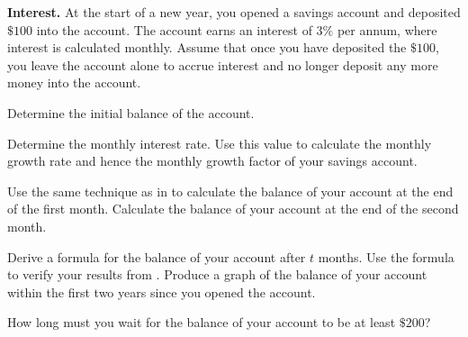 \documentclass[a4paper,oneside,12pt]{article}
\begin{document}
\begin{exercise}
\textbf{Interest.}
At the start of a new year, you opened a savings account and deposited
$\$100$ into the account.  The account earns an interest of $3\%$ per
annum, where interest is calculated monthly.  Assume that once you
have deposited the $\$100$, you leave the account alone to accrue
interest and no longer deposit any more money into the account.
\begin{packedenum}
\item\label{subex:interest_initial_balance}
  Determine the initial balance of the account.

\item\label{subex:interest_growth_rate}
  Determine the monthly interest rate.  Use this value to calculate
  the monthly growth rate and hence the monthly growth factor of
  your savings account.

\item\label{subex:interest_balance_1month_2months}
  Use the same technique as in
   to calculate
  the balance of your account at the end of the first month.
  Calculate the balance of your account at the end of the second
  month.

\item\label{subex:interest_balance_formula}
  Derive a formula for the balance of your account after $t$ months.
  Use the formula to verify your results
  from .  Produce a graph
  of the balance of your account within the first two years since you
  opened the account.

\item\label{subex:interest_200_dollars}
  How long must you wait for the balance of your account to be at
  least $\$200$?
\end{packedenum}
\end{exercise}
\end{document}
